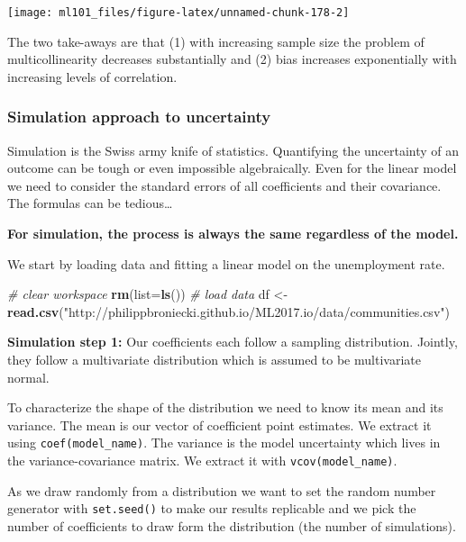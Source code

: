\documentclass[]{article}
\newenvironment{Shaded}{\begin{snugshade}}{\end{snugshade}}
\newcommand{\CommentTok}[1]{\textcolor[rgb]{0.56,0.35,0.01}{\textit{#1}}}
\newcommand{\DataTypeTok}[1]{\textcolor[rgb]{0.13,0.29,0.53}{#1}}
\newcommand{\KeywordTok}[1]{\textcolor[rgb]{0.13,0.29,0.53}{\textbf{#1}}}
\newcommand{\NormalTok}[1]{#1}
\newcommand{\StringTok}[1]{\textcolor[rgb]{0.31,0.60,0.02}{#1}}
\begin{document}
\begin{center}\texttt{[image: ml101\_files/figure-latex/unnamed-chunk-178-2]} \end{center}

The two take-aways are that (1) with increasing sample size the problem of multicollinearity decreases substantially and (2) bias increases exponentially with increasing levels of correlation.

\hypertarget{simulation-approach-to-uncertainty}{%
\subsubsection{Simulation approach to uncertainty}\label{simulation-approach-to-uncertainty}}

Simulation is the Swiss army knife of statistics. Quantifying the uncertainty of an outcome can be tough or even impossible algebraically. Even for the linear model we need to consider the standard errors of all coefficients and their covariance. The formulas can be tedious\ldots{}

\textbf{For simulation, the process is always the same regardless of the model.}

We start by loading data and fitting a linear model on the unemployment rate.

\begin{Shaded}
\begin{Highlighting}[]
\CommentTok{# clear workspace}
\KeywordTok{rm}\NormalTok{(}\DataTypeTok{list=}\KeywordTok{ls}\NormalTok{())}
\CommentTok{# load data}
\NormalTok{df <-}\StringTok{ }\KeywordTok{read.csv}\NormalTok{(}\StringTok{"http://philippbroniecki.github.io/ML2017.io/data/communities.csv"}\NormalTok{)}
\end{Highlighting}
\end{Shaded}

\textbf{Simulation step 1:} Our coefficients each follow a sampling distribution. Jointly, they follow a multivariate distribution which is assumed to be multivariate normal.

To characterize the shape of the distribution we need to know its mean and its variance. The mean is our vector of coefficient point estimates. We extract it using \texttt{coef(model\_name)}. The variance is the model uncertainty which lives in the variance-covariance matrix. We extract it with \texttt{vcov(model\_name)}.

As we draw randomly from a distribution we want to set the random number generator with \texttt{set.seed()} to make our results replicable and we pick the number of coefficients to draw form the distribution (the number of simulations).
\end{document}
